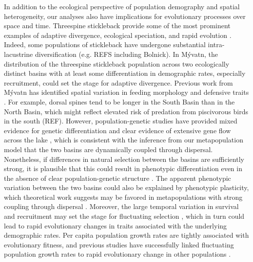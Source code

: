 \documentclass[11pt]{article}
\begin{document}
In addition to the ecological perspective
of population demography and spatial heterogeneity,
our analyses also have implications for evolutionary processes over space and time.
Threespine stickleback provide some of the most prominent examples of adaptive divergence,
ecological speciation, and rapid evolution \citep[reviewed in][]{hendry2013stickleback}.
Indeed, some populations of stickleback
have undergone substantial intra-lacustrine diversification (e.g. REFS including Bolnick).
In M\'{y}vatn, the distribution of the threespine stickleback population across
two ecologically distinct basins with at least some differentiation in demographic rates,
especially recruitment, could set the stage for adaptive divergence.
Previous work from M\'{y}vatn has identified spatial variation
in feeding morphology and defensive traits \citep{millet2013}.
For example, dorsal spines tend to be longer in the South Basin than in the North Basin,
which might reflect elevated risk of predation from piscivorous birds in the south (REF).
However, population-genetic studies have provided mixed evidence
for genetic differentiation and clear evidence of extensive gene flow
across the lake \citep{olafsdottir2007postglacial, millet2013},
which is consistent with the inference from our metapopulation model that the two basins
are dynamically coupled through dispersal.
Nonetheless, if differences in natural selection between the basins are sufficiently strong,
it is plausible that this could result in phenotypic differentiation
even in the absence of clear population-genetic structure
\citep{rasanen2008disentangling}.
The apparent phenotypic variation between the two basins
could also be explained by phenotypic plasticity,
which theoretical work suggests may be favored in metapopulations
with strong coupling through dispersal \citep{sultan2002metapopulation}.
Moreover, the large temporal variation in survival and recruitment may set the stage
for fluctuating selection \citep{siepielski2009s},
which in turn could lead to rapid evolutionary changes in traits associated
with the underlying demographic rates.
Per capita population growth rates are tightly associated with evolutionary fitness,
and previous studies have successfully linked fluctuating population growth rates
to rapid evolutionary change in other populations
\citep{coulson2008dynamics, engen2014estimating, de2019stage}.
\end{document}
